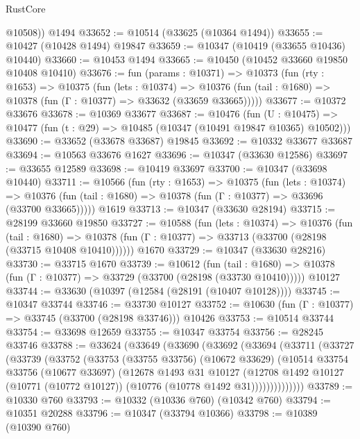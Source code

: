 \begin{lexlean}{RustCore}
\begin{coremodule}
        @10508))
    @1494
@33652 := @10514 (@33625 (@10364 @1494))
@33655 := @10427 (@10428 @1494) @19847
@33659 := @10347 (@10419 (@33655 @10436) @10440)
@33660 := @10453 @1494
@33665 := @10450 (@10452 @33660 @19850 @10408 @10410)
@33676 := fun (params : @10371) =>
  @10373
    (fun (rty : @1653) =>
    @10375
      (fun (lets : @10374) =>
      @10376 (fun (tail : @1680) => @10378 (fun (Γ : @10377) => @33632 (@33659 @33665)))))
@33677 := @10372 @33676
@33678 := @10369 @33677
@33687 := @10476
    (fun (U : @10475) => @10477 (fun (t : @29) => @10485 (@10347 (@10491 @19847 @10365) @10502)))
@33690 := @33652 (@33678 @33687) @19845
@33692 := @10332 @33677 @33687
@33694 := @10563 @33676 @1627
@33696 := @10347 (@33630 @12586)
@33697 := @33655 @12589
@33698 := @10419 @33697
@33700 := @10347 (@33698 @10440)
@33711 := @10566
    (fun (rty : @1653) =>
    @10375
      (fun (lets : @10374) =>
      @10376 (fun (tail : @1680) => @10378 (fun (Γ : @10377) => @33696 (@33700 @33665)))))
    @1619
@33713 := @10347 (@33630 @28194)
@33715 := @28199 @33660 @19850
@33727 := @10588
    (fun (lets : @10374) =>
    @10376
      (fun (tail : @1680) =>
      @10378 (fun (Γ : @10377) => @33713 (@33700 (@28198 (@33715 @10408 @10410))))))
    @1670
@33729 := @10347 (@33630 @28216)
@33730 := @33715 @1670
@33739 := @10612
    (fun (tail : @1680) => @10378 (fun (Γ : @10377) => @33729 (@33700 (@28198 (@33730 @10410)))))
    @10127
@33744 := @33630 (@10397 (@12584 (@28191 (@10407 @10128))))
@33745 := @10347 @33744
@33746 := @33730 @10127
@33752 := @10630 (fun (Γ : @10377) => @33745 (@33700 (@28198 @33746))) @10426
@33753 := @10514 @33744
@33754 := @33698 @12659
@33755 := @10347 @33754
@33756 := @28245 @33746
@33788 := @33624
    (@33649
      (@33690
        (@33692
          (@33694
            (@33711
              (@33727
                (@33739
                  (@33752
                    (@33753
                      (@33755 @33756)
                      (@10672 @33629)
                      (@10514
                        @33754
                        @33756
                        (@10677 @33697)
                        (@12678
                          @1493
                          @31
                          @10127
                          (@12708
                            @1492
                            @10127
                            (@10771 (@10772 @10127))
                            (@10776 (@10778 @1492 @31))))))))))))))
@33789 := @10330 @760
@33793 := @10332 (@10336 @760) (@10342 @760)
@33794 := @10351 @20288
@33796 := @10347 (@33794 @10366)
@33798 := @10389 (@10390 @760)

\end{coremodule}
\end{lexlean}
